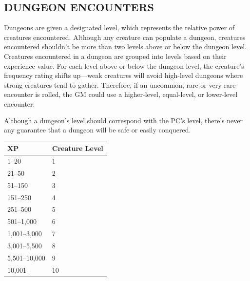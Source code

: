 \begin{multicols}{2}
\begin{minipage}{\columnwidth}
\end{minipage}

\section{DUNGEON ENCOUNTERS}

Dungeons are given a designated level, which represents the relative power of creatures encountered.  Although any creature can populate a dungeon, creatures encountered shouldn't be more than two levels above or below the dungeon level.  Creatures encountered in a dungeon are grouped into levels based on their experience value.  For each level above or below the dungeon level, the creature's frequency rating shifts up---weak creatures will avoid high-level dungeons where strong creatures tend to gather. Therefore, if an uncommon, rare or very rare encounter is rolled, the GM could use a higher-level, equal-level, or lower-level encounter.

Although a dungeon's level should correspond with the PC's level, there's never any guarantee that a dungeon will be safe or easily conquered.

\noindent
\begin{minipage}{\columnwidth}

\label{creaturelevel}
\noindent
\begin{tabular}{|p{}|p{}|}
\hline
XP	& Creature Level \\
\hline\hline
\rowcolor[gray]{.9}1--20	& 1 \\
21--50	& 2 \\
\rowcolor[gray]{.9}51--150	& 3 \\
151--250	& 4 \\
\rowcolor[gray]{.9}251--500	& 5 \\
501--1,000	& 6 \\
\rowcolor[gray]{.9}1,001--3,000	& 7 \\
3,001--5,500	& 8 \\
\rowcolor[gray]{.9}5,501--10,000	& 9 \\
10,001+	& 10 \\
\hline
\end{tabular}

\end{minipage}

\noindent
\begin{minipage}{\columnwidth}


\end{minipage}
\end{multicols}
